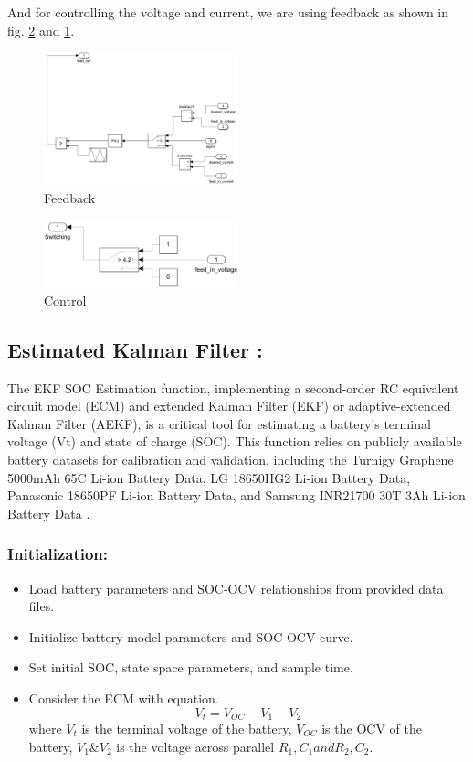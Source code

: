 \documentclass[conference]{IEEEtran}
\begin{document}
And for controlling the voltage and current, we are using feedback as shown in fig. \ref{control} and \ref{feedback}.
\begin{figure}[htbp]
    \centering
    \includegraphics[width=0.5\textwidth]{images/feedback.jpeg}
    \caption{Feedback}
    \label{feedback}
\end{figure}

\begin{figure}[htbp]
    \centering
    \includegraphics[width=0.5\textwidth]{images/control.jpeg}
    \caption{Control}
    \label{control}
\end{figure}

\subsection{Estimated Kalman Filter :}
The EKF SOC Estimation function, implementing a second-order RC equivalent circuit model (ECM) and extended Kalman Filter (EKF) or adaptive-extended Kalman Filter (AEKF), is a critical tool for estimating a battery's terminal voltage (Vt) and state of charge (SOC). This function relies on publicly available battery datasets for calibration and validation, including the Turnigy Graphene 5000mAh 65C Li-ion Battery Data, LG 18650HG2 Li-ion Battery Data, Panasonic 18650PF Li-ion Battery Data, and Samsung INR21700 30T 3Ah Li-ion Battery Data \cite{turnigy_data}\cite{lg_data}\cite{samsung_data}\cite{panasonic_data}.


\subsubsection{Initialization:}
\begin{itemize}
  \item Load battery parameters and SOC-OCV relationships from provided data files.
  \item Initialize battery model parameters and SOC-OCV curve.
  \item Set initial SOC, state space parameters, and sample time.
  \item Consider the ECM with equation.
  $${V_t = V_{OC} - V_1 - V_2}$$
  where $V_t$ is the terminal voltage of the battery, $V_{OC}$ is the OCV of the battery, $V_1 \& V_2$ is the voltage across parallel $R_1, C_1 and R_2, C_2$.
\end{itemize}
\end{document}
